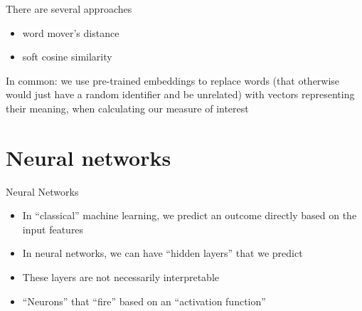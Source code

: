 \documentclass[compress]{beamer}
\begin{document}
\begin{frame}{There are several approaches}
	\begin{itemize}
		\item word mover's distance
		\item soft cosine similarity
	\end{itemize}
	In common: we use pre-trained embeddings to replace words (that otherwise would just have a random identifier and be unrelated) with vectors representing their meaning, when calculating our measure of interest
\end{frame}

\section{Neural networks}


\begin{frame}{Neural Networks}
	\begin{itemize}
		\item In ``classical'' machine learning, we predict an outcome directly based on the input features
		\item In neural networks, we can have ``hidden layers'' that we predict
		\item These layers are not necessarily interpretable
		\item ``Neurons'' that ``fire'' based on an ``activation function''
	\end{itemize}
	
\end{frame}
\end{document}
